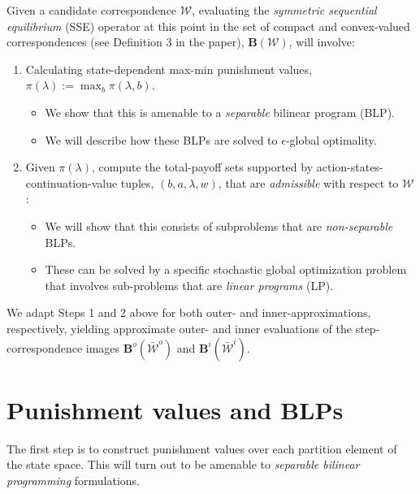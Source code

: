 \documentclass[a4paper,10pt,english]{sphinxmanual}
\begin{document}
Given a candidate correspondence \(\mathcal{W}\), evaluating the \emph{symmetric sequential equilibrium} (SSE) operator at this point in the set of compact and convex-valued correspondences (see Definition 3 in the paper), \(\mathbf{B}(\mathcal{W})\), will involve:
\begin{enumerate}
\item {} 
Calculating state-dependent max-min punishment values,
\(\pi(\lambda) := \max_{b} \pi(\lambda,b)\).
\begin{itemize}
\item {} 
We show that this is amenable to a \emph{separable} bilinear program (BLP).

\item {} 
We will describe how these BLPs are solved to \(\epsilon\)-global optimality.

\end{itemize}

\item {} 
Given \(\pi (\lambda)\), compute the total-payoff sets supported by action-states-continuation-value tuples, \((b,a,\lambda,w)\), that are \emph{admissible} with respect to \(\mathcal{W}\):
\begin{itemize}
\item {} 
We will show that this consists of subproblems that are \emph{non-separable}
BLPs.

\item {} 
These can be solved by a specific stochastic global optimization problem
that involves sub-problems that are \emph{linear programs} (LP).

\end{itemize}

\end{enumerate}

We adapt Steps 1 and 2 above for both outer- and inner-approximations, respectively, yielding  approximate outer- and inner evaluations of the step-correspondence images
\(\mathbf{B}^{o}(\bar{\mathcal{W}}^{o})\) and \(\mathbf{B}^{i}(\bar{\mathcal{W}}^{i})\).


\chapter{Punishment values and BLPs}
\label{payoff_bilinear_punish:punishment-values-and-blps}\label{payoff_bilinear_punish::doc}
The first step is to construct punishment values over each partition element
of the state space. This will turn out to be amenable to \emph{separable bilinear
programming} formulations.
\end{document}
